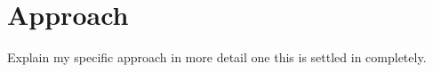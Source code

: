 
\section{Approach}

Explain my specific approach in more detail one this is settled in completely. 






